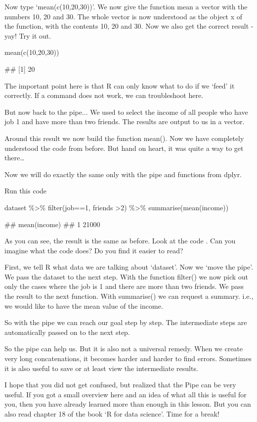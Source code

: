 Now type ‘mean(c(10,20,30))’. We now give the function mean a vector with the numbers 10, 20 and 30. The whole vector is now understood as the object x of the function, with the contents 10, 20 and 30. Now we also get the correct result - yay! Try it out.

\begin{rblock1}
mean(c(10,20,30))

## [1] 20
\end{rblock1}

The important point here is that R can only know what to do if we ‘feed’ it correctly. If a command does not work, we can troubleshoot here.

But now back to the pipe... We used  to select the income of all people who have job 1 and have more than two friends. The results are output to us in a vector.

Around this result we now build the function mean(). Now we have completely understood the code from before. But hand on heart, it was quite a way to get there…

Now we will do exactly the same only with the pipe and functions from dplyr.

Run this code 

\begin{rblock1}
dataset \%>\% filter(job==1, friends >2) \%>\% summarise(mean(income))

##   mean(income)
## 1        21000
\end{rblock1}
	
As you can see, the result is the same as before. Look at the code . Can you imagine what the code does? Do you find it easier to read?

First, we tell R what data we are talking about ‘dataset’. Now we ‘move the pipe’. We pass the dataset to the next step. With the function filter() we now pick out only the cases where the job is 1 and there are more than two friends. We pass the result to the next function. With summarise() we can request a summary. i.e., we would like to have the mean value of the income.

So with the pipe we can reach our goal step by step. The intermediate steps are automatically passed on to the next step.

So the pipe can help us. But it is also not a universal remedy. When we create very long concatenations, it becomes harder and harder to find errors. Sometimes it is also useful to save or at least view the intermediate results.

I hope that you did not get confused, but realized that the Pipe can be very useful. If you got a small overview here and an idea of what all this is useful for you, then you have already learned more than enough in this lesson. But you can also read chapter 18 of the book ‘R for data science’. Time for a break!
